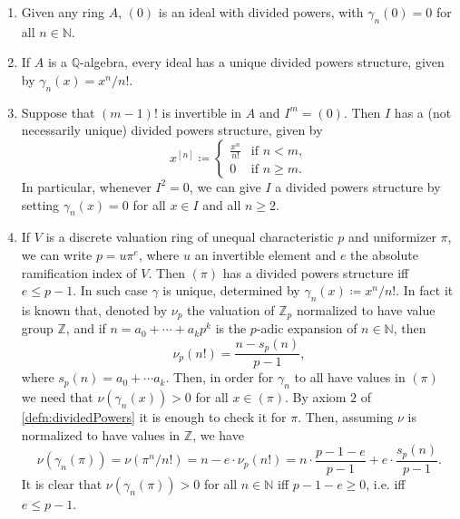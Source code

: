 \documentclass[../Main]{subfiles}
\begin{document}
\begin{ex}\leavevmode\vspace{-.2\baselineskip}
\begin{enumerate}
	\item Given any ring $A$, $(0)$ is an ideal with divided powers,
		with $\gamma_n(0) = 0$ for all $n \in \mathbb{N}$.

	\item If $A$ is a $\mathbb{Q}$-algebra, every ideal has a unique
		divided powers structure, given by $\gamma_n(x) = x^n/n!$.

	\item Suppose that $\left( m-1 \right)!$ is invertible in $A$ and 
		$I^m = (0)$.
		Then $I$ has a (not necessarily unique) divided powers structure, given by
		\begin{equation*}
			x^{[n]} \coloneqq
			\begin{cases}
				\frac{ x^n }{ n! } & \text{if } n < m,\\
				0 & \text{if } n \geq m.
			\end{cases} 
		\end{equation*}
		In particular, whenever $I^2 = 0$, we can give $I$ a
		divided powers structure by setting $\gamma_n(x) = 0$
		for all $x \in I$ and all $n \geq 2$.

	\item If $V$ is a discrete valuation ring of unequal characteristic $p$
		and uniformizer $\pi$, we can write $p = u \pi^e$,
		where $u$ an invertible element and $e$ the absolute ramification
		index of $V$.
		Then $\left( \pi \right)$ has a divided powers structure iff $e \leq p-1$.
		In such case $\gamma$ is unique, determined by
		$\gamma_n(x) \coloneqq x^n/n!$.
		In fact it is known that, denoted by $\nu_p$ the valuation
		of $\mathbb{Z}_{p}$ normalized to have value group $\mathbb{Z}$,
		and if $n = a_0 + \cdots + a_kp^k$ is the $p$-adic expansion
		of $n \in \mathbb{N}$, then
		\begin{equation*}
			\nu_p(n!) = 
			\frac{n - s_p(n)}{p-1}
		,\end{equation*}
		where $s_p(n) = a_0 + \cdots a_k$.
		Then, in order for $\gamma_n$ to all have values in $(\pi)$
		we need that $\nu(\gamma_n(x)) > 0$ for all $x \in (\pi)$.
		By axiom $2$ of \cref{defn:dividedPowers}
		it is enough to check it for $\pi$.
		Then, assuming $\nu$ is normalized to have values in $\mathbb{Z}$,
		we have
		\begin{equation*}
			\nu(\gamma_n(\pi)) = \nu(\pi^n/n!) =
			n - e \cdot \nu_p(n!) =
			n \cdot \frac{p - 1 - e}{p - 1} + e \cdot \frac{s_p(n)}{p - 1}
		.\end{equation*}
		It is clear that $\nu(\gamma_n(\pi)) > 0$ for all $n \in \mathbb{N}$
		iff $p - 1 - e \geq 0$, i.e. iff $e \leq p - 1$.
\end{enumerate}
\end{ex} 
\end{document}

